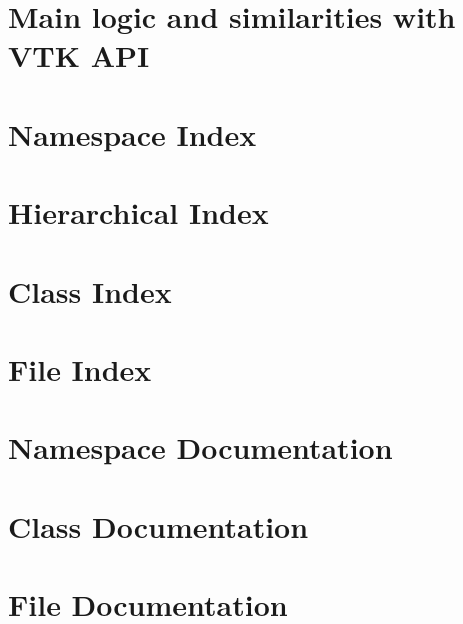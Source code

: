 \let\mypdfximage\pdfximage\def\pdfximage{\immediate\mypdfximage}\documentclass[twoside]{book}
\newcommand{\+}{\discretionary{\mbox{\scriptsize$\hookleftarrow$}}{}{}}
\newcommand{\clearemptydoublepage}{%
  \newpage{\pagestyle{empty}\cleardoublepage}%
}
\begin{document}
\chapter{Main logic and similarities with V\+TK A\+PI}
\label{md_doc_vtkstyle}

\chapter{Namespace Index}

\chapter{Hierarchical Index}

\chapter{Class Index}

\chapter{File Index}

\chapter{Namespace Documentation}

\chapter{Class Documentation}





















\chapter{File Documentation}


































\backmatter
\newpage
{}
\clearemptydoublepage
{}
\printindex
\end{document}
